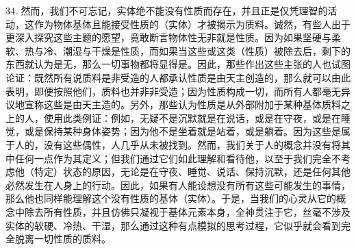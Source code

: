 34. 然而，我们不可忘记，实体绝不能没有性质而存在，并且正是仅凭理智的活动，这作为物体基体且能接受性质的（实体）才被揭示为质料。诚然，有些人出于更深入探究这些主题的愿望，竟敢断言物体性无非就是性质。因为如果坚硬与柔软、热与冷、潮湿与干燥是性质，而如果当这些或这类（性质）被除去后，剩下的东西就认为是无，那么一切事物都将显得是。因此，那些作出这些主张的人也试图论证：既然所有说质料是非受造的人都承认性质是由天主创造的，那么就可以由此表明，即便按照他们，质料也并非非受造；因为性质构成一切，而所有人都毫无异议地宣称这些是由天主造的。另外，那些认为性质是从外部附加于某种基体质料之上的人，使用此类例证：例如，无疑不是沉默就是在说话，或是在守夜，或是在睡觉，或是保持某种身体姿势；因为他不是坐着就是站着，或是躺着。因为这些是属于人的，没有这些偶性，人几乎从未被找到。然而，我们关于人的概念并没有将其中任何一点作为其定义；但我们通过它们如此理解和看待他，以至于我们完全不考虑他（特定）状态的原因，无论是在守夜、睡觉、说话、保持沉默，还是任何其他必然发生在人身上的行动。因此，如果有人能设想没有所有这些可能发生的事情，那么他也同样能理解这个没有性质的基体（实体）。于是，当我们的心灵从它的概念中除去所有性质，并且仿佛只凝视于基体元素本身，全神贯注于它，丝毫不涉及实体的软硬、冷热、干湿，那么通过这种有点模拟的思考过程，它似乎就会看到完全脱离一切性质的质料。\par

